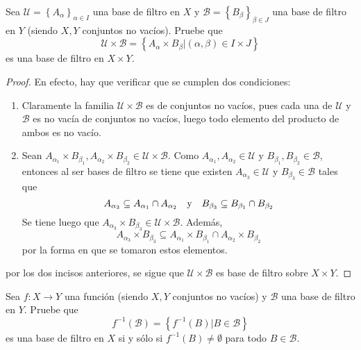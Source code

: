 \documentclass[12pt]{report}
\theoremstyle{largebreak}
\newcommand\cf[3]{\ensuremath{#1:#2\rightarrow#3}}
\begin{document}
    \begin{excer}
        Sea $\mathcal{U}=\left\{A_\alpha\right\}_{\alpha\in I}$ una base de filtro en $X$ y $\mathcal{B}=\left\{B_\beta\right\}_{\beta\in J}$ una base de filtro en $Y$ (siendo $X,Y$ conjuntos no vacíos). Pruebe que
        \begin{equation*}
            \mathcal{U}\times\mathcal{B}=\left\{A_\alpha\times B_\beta\Big|(\alpha,\beta)\in I\times J \right\}
        \end{equation*}
        es una base de filtro en $X\times Y$.
    \end{excer}

    \begin{proof}
        En efecto, hay que verificar que se cumplen dos condiciones:
        \begin{enumerate}
            \item Claramente la familia $\mathcal{U}\times\mathcal{B}$ es de conjuntos no vacíos, pues cada una de $\mathcal{U}$ y $\mathcal{B}$ es no vacía de conjuntos no vacíos, luego todo elemento del producto de ambos es no vacío.
            \item Sean $A_{\alpha_1}\times B_{\beta_1},A_{\alpha_2}\times B_{\beta_2}\in\mathcal{U}\times\mathcal{B}$. Como $A_{\alpha_1},A_{\alpha_2}\in\mathcal{U}$ y $B_{\beta_1},B_{\beta_2}\in\mathcal{B}$, entonces al ser bases de filtro se tiene que existen $A_{\alpha_3}\in\mathcal{U}$ y $B_{\beta_3}\in\mathcal{B}$ tales que
            \begin{equation*}
                A_{\alpha_3}\subseteq A_{\alpha_1}\cap A_{\alpha_2}\quad\textup{y}\quad B_{\beta_3}\subseteq B_{\beta_1}\cap B_{\beta_2}
            \end{equation*}
            Se tiene luego que $A_{\alpha_3}\times B_{\beta_3}\in\mathcal{U}\times\mathcal{B}$. Además,
            \begin{equation*}
                A_{\alpha_3}\times B_{\beta_3}\subseteq A_{\alpha_1}\times B_{\beta_1}\cap A_{\alpha_2}\times B_{\beta_2}
            \end{equation*}
            por la forma en que se tomaron estos elementos.
        \end{enumerate}
        por los dos incisos anteriores, se sigue que $\mathcal{U}\times\mathcal{B}$ es base de filtro sobre $X\times Y$.
    \end{proof}

    \begin{excer}
        Sea $\cf{f}{X}{Y}$ una función (siendo $X,Y$ conjuntos no vacíos) y $\mathcal{B}$ una base de filtro en $Y$. Pruebe que
        \begin{equation*}
            f^{-1}(\mathcal{B})=\left\{f^{-1}(B)\Big|B\in\mathcal{B} \right\}
        \end{equation*}
        es una base de filtro en $X$ si y sólo si $f^{-1}(B)\neq\emptyset$ para todo $B\in\mathcal{B}$.
    \end{excer}
\end{document}
